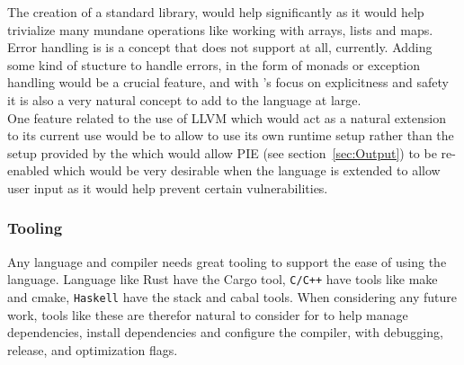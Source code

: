 The creation of a standard library, would help \lang{} significantly as it would help
trivialize many mundane operations like working with arrays, lists and maps. \\

Error handling is is a concept that \lang{} does not support at all, currently.
Adding some kind of stucture to handle errors, in the form of monads or exception
handling would be a crucial feature, and with \lang's focus on explicitness and
safety it is also a very natural concept to add to the language at large.\\

One feature related to the use of LLVM which would act as a natural extension to its
current use would be to allow \lang{} to use its own runtime setup rather than the
setup provided by the \gcc{} which would allow PIE (see section~\ref{sec:Output}) to be
re-enabled which would be very desirable when the language is extended to allow user
input as it would help prevent certain vulnerabilities.

\subsubsection{Tooling} \label{sec:tooling}

Any language and compiler needs great tooling to support the ease of using the
language. Language like Rust have the Cargo tool, \texttt{C/C++} have tools like make
and cmake, \texttt{Haskell} have the stack and cabal tools. When considering any
future work, tools like these are therefor natural to consider for \lang{} to help
manage dependencies, install dependencies and configure the compiler, with debugging,
release, and optimization flags. 

